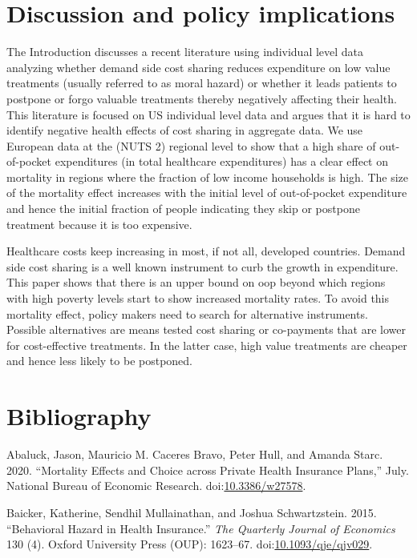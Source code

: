 \documentclass[a4paper,12pt]{article}
\begin{document}
\section{Discussion and policy implications}
\label{sec:org1fc71cc}

The Introduction discusses a recent literature using individual level data analyzing whether demand side cost sharing reduces expenditure on low value treatments (usually referred to as moral hazard) or whether it leads patients to postpone or forgo valuable treatments thereby negatively affecting their health. This literature is focused on US individual level data and argues that it is hard to identify negative health effects of cost sharing in aggregate data. We use European data at the (NUTS 2) regional level to show that a high share of out-of-pocket expenditures (in total healthcare expenditures) has a clear effect on mortality in regions where the fraction of low income households is high. The size of the mortality effect increases with the initial level of out-of-pocket expenditure and hence the initial fraction of people indicating they skip or postpone treatment because it is too expensive.

Healthcare costs keep increasing in most, if not all, developed countries. Demand side cost sharing is a well known instrument to curb the growth in expenditure. This paper shows that there is an upper bound on oop beyond which regions with high poverty levels start to show increased mortality rates. To avoid this mortality effect, policy makers need to search for alternative instruments. Possible alternatives are means tested cost sharing or co-payments that are lower for cost-effective treatments. In the latter case, high value treatments are cheaper and hence less likely to be postponed.


\section{Bibliography}
\label{sec:orgdc3ea46}

\hypertarget{citeproc_bib_item_1}{Abaluck, Jason, Mauricio M. Caceres Bravo, Peter Hull, and Amanda Starc. 2020. “Mortality Effects and Choice across Private Health Insurance Plans,” July. National Bureau of Economic Research. doi:\href{https://doi.org/10.3386/w27578}{10.3386/w27578}.}

\hypertarget{citeproc_bib_item_2}{Baicker, Katherine, Sendhil Mullainathan, and Joshua Schwartzstein. 2015. “Behavioral Hazard in Health Insurance.” \textit{The Quarterly Journal of Economics} 130 (4). Oxford University Press (OUP): 1623–67. doi:\href{https://doi.org/10.1093/qje/qjv029}{10.1093/qje/qjv029}.}
\end{document}
